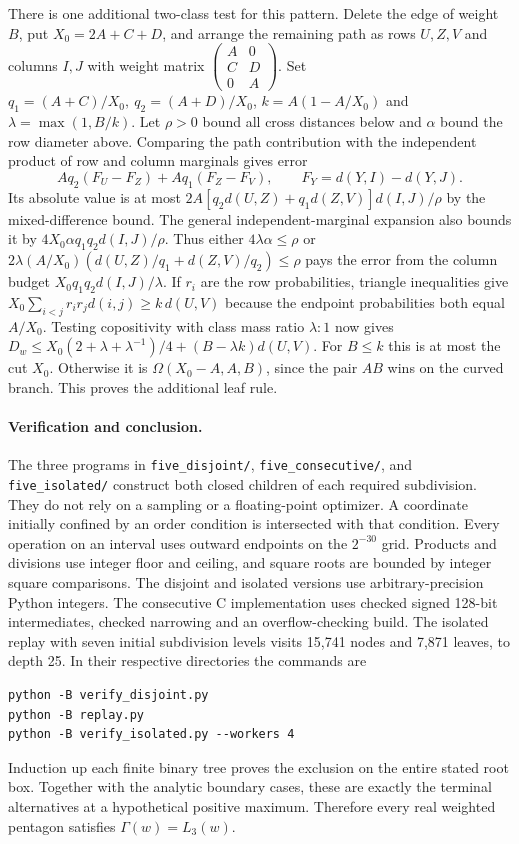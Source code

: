 \documentclass[11pt,a4paper]{article}
\theoremstyle{definition}
\begin{document}
There is one additional two-class test for this pattern. Delete the edge
of weight $B$, put $X_0=2A+C+D$, and arrange the remaining path as rows
$U,Z,V$ and columns $I,J$ with weight matrix
$\left(\begin{smallmatrix}A&0\\ C&D\\0&A\end{smallmatrix}\right)$.
Set $q_1=(A+C)/X_0,\ q_2=(A+D)/X_0$, $k=A(1-A/X_0)$ and
$\lambda=\max(1,B/k)$. Let $\rho>0$ bound all cross distances below and
$\alpha$ bound the row diameter above. Comparing the path contribution
with the independent product of row and column marginals gives error
\[
 A q_2(F_U-F_Z)+Aq_1(F_Z-F_V),\qquad F_Y=d(Y,I)-d(Y,J).
\]
Its absolute value is at most
$2A[q_2d(U,Z)+q_1d(Z,V)]d(I,J)/\rho$ by the mixed-difference bound.
The general independent-marginal expansion also bounds it by
$4X_0\alpha q_1q_2d(I,J)/\rho$.
Thus either $4\lambda\alpha\le\rho$ or
$2\lambda(A/X_0)(d(U,Z)/q_1+d(Z,V)/q_2)\le\rho$ pays the error
from the column budget $X_0q_1q_2d(I,J)/\lambda$.
If $r_i$ are the row probabilities, triangle inequalities give
$X_0\sum_{i<j}r_ir_jd(i,j)\ge k\,d(U,V)$ because the endpoint
probabilities both equal $A/X_0$. Testing copositivity with class
mass ratio $\lambda:1$ now gives
$D_w\le X_0(2+\lambda+\lambda^{-1})/4+(B-\lambda k)d(U,V)$.
For $B\le k$ this is at most the cut $X_0$. Otherwise it is
$\Omega(X_0-A,A,B)$, since the pair $AB$ wins on the curved branch.
This proves the additional leaf rule.

\paragraph{Verification and conclusion.}
The three programs in \texttt{five\_disjoint/},
\texttt{five\_consecutive/}, and \texttt{five\_isolated/} construct
both closed children of each required subdivision. They do not rely
on a sampling or a floating-point optimizer. A coordinate initially
confined by an order condition is intersected with that condition.
Every operation on an interval uses outward endpoints on the
$2^{-30}$ grid. Products and divisions use integer floor and ceiling,
and square roots are bounded by integer square comparisons. The
disjoint and isolated versions use arbitrary-precision Python integers.
The consecutive C implementation uses checked signed 128-bit
intermediates, checked narrowing and an overflow-checking build.
The isolated replay with seven initial subdivision levels visits
15,741 nodes and 7,871 leaves, to depth 25. In their respective
directories the commands are
\begin{verbatim}
python -B verify_disjoint.py
python -B replay.py
python -B verify_isolated.py --workers 4
\end{verbatim}
Induction up each finite binary tree proves the exclusion on the
entire stated root box. Together with the analytic boundary cases,
these are exactly the terminal alternatives at a hypothetical positive
maximum. Therefore every real weighted pentagon satisfies
$\Gamma(w)=L_3(w)$.
\end{document}
